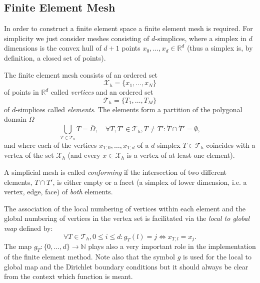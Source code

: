 \documentclass[a4paper,12pt]{article}
\begin{document}
\subsection{Finite Element Mesh}

In order to construct a finite element space a finite element mesh is required.
For simplicity we just consider meshes consisting of $d$-simplices, where a simplex
in $d$ dimensions is the convex hull of $d+1$ points $x_{0},\ldots,x_{d}\in\mathbb{R}^d$
(thus a simplex is, by definition, a closed set of points).

The finite element mesh consists of an ordered set
\begin{equation}
\mathcal{X}_h = \{x_1,\ldots,x_N\}
\end{equation}
of points in $\mathbb{R}^d$ called {\em vertices} and an ordered set 
\begin{equation}
\mathcal{T}_h = \{T_1, \ldots, T_M\}
\end{equation}
of $d$-simplices called {\em elements}.
The elements form a partition of the polygonal domain $\Omega$
\begin{equation}
\bigcup_{T\in \mathcal{T}_h} T = \overline{\Omega}, \quad 
\forall T, T' \in \mathcal{T}_h, T\neq T' : \mathring{T} \cap \mathring{T}' = \emptyset,
\end{equation}
and where each of the vertices $x_{T,0},\ldots,x_{T,d}$  of a $d$-simplex $T\in\mathcal{T}_h$
coincides with a vertex of the set $\mathcal{X}_h$ (and every $x\in\mathcal{X}_h$ is a vertex
of at least one element).

A simplicial mesh is called {\em conforming} if
the intersection of two different elements, $T\cap T'$, is either
empty or a facet (a simplex of lower dimension, i.e. a vertex, edge, face) of {\em both} elements.

The association of the local numbering of vertices within each element 
and the global numbering of vertices in the vertex set is facilitated
via the {\em local to global map} defined by:
\begin{equation}
\forall T\in\mathcal{T}_h, 0\leq i \leq d: g_T(l) = j \Leftrightarrow x_{T,l} = x_{j} .
\end{equation}
The map $g_T : \{0,\ldots,d\}\to\mathbb{N}$ 
plays also a very important role in the implementation of the finite element method.
Note also that the symbol $g$ is used for the local to global map and the Dirichlet
boundary conditions but it should always be clear from the context which function is meant.
\end{document}

